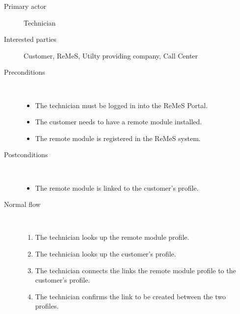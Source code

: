 \begin{description}
	\item[Primary actor] Technician
	\item[Interested parties] Customer, ReMeS, Utilty providing company, Call
	Center
	\item[Preconditions] \  
	\begin{itemize}
		\item The technician must be logged in into the ReMeS Portal.
		\item The customer needs to have a remote module installed.
		\item The remote module is registered in the ReMeS system.
	\end{itemize}
	\item[Postconditions] \ 
	\begin{itemize}
		\item The remote module is linked to the customer's profile.
	\end{itemize}
	\item[Normal flow] \ 
	\begin{enumerate}
	  	\item The technician looks up the remote module profile.
	  	\item The technician looks up the customer's profile.
	  	\item The technician connects the links the remote module profile to the
	  	customer's profile.
	  	\item The technician confirms the link to be created between the two
	  	profiles.
	\end{enumerate}
\end{description}